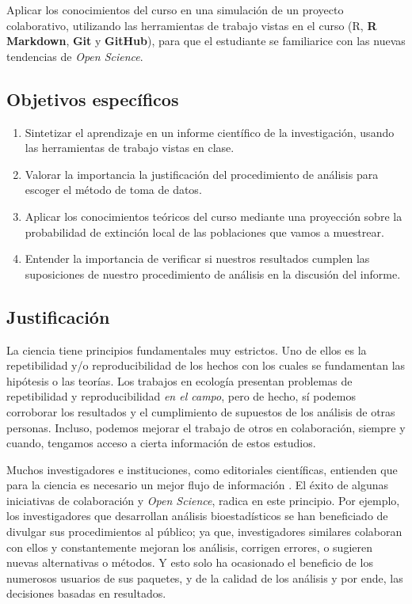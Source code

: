 \documentclass[12pt,letterpaper,]{book}
\begin{document}
Aplicar los conocimientos del curso en una simulación de un proyecto
colaborativo, utilizando las herramientas de trabajo vistas en el curso
(\textsf{R}, \textbf{R Markdown}, \textbf{Git} y \textbf{GitHub}), para
que el estudiante se familiarice con las nuevas tendencias de \emph{Open
Science}.

\subsection{Objetivos específicos}\label{objetivos-especificos}

\begin{enumerate}
\def\labelenumi{\arabic{enumi}.}
\item
  Sintetizar el aprendizaje en un informe científico de la
  investigación, usando las herramientas de trabajo vistas en clase.
\item
  Valorar la importancia la justificación del procedimiento de análisis
  para escoger el método de toma de datos.
\item
  Aplicar los conocimientos teóricos del curso mediante una proyección
  sobre la probabilidad de extinción local de las poblaciones que vamos
  a muestrear.
\item
  Entender la importancia de verificar si nuestros resultados cumplen
  las suposiciones de nuestro procedimiento de análisis en la discusión
  del informe.
\end{enumerate}

\subsection{Justificación}\label{justificacion}

La ciencia tiene principios fundamentales muy estrictos. Uno de ellos es
la repetibilidad y/o reproducibilidad de los hechos con los cuales se
fundamentan las hipótesis o las teorías. Los trabajos en ecología
presentan problemas de repetibilidad y reproducibilidad \emph{en el
campo}, pero de hecho, sí podemos corroborar los resultados y el
cumplimiento de supuestos de los análisis de otras personas. Incluso,
podemos mejorar el trabajo de otros en colaboración, siempre y cuando,
tengamos acceso a cierta información de estos estudios.

Muchos investigadores e instituciones, como editoriales científicas,
entienden que para la ciencia es necesario un mejor flujo de información
\citep{dataManagmentBES, reprodCodeBES}. El éxito de algunas iniciativas
de colaboración y \emph{Open Science}, radica en este principio. Por
ejemplo, los investigadores que desarrollan análisis bioestadísticos se
han beneficiado de divulgar sus procedimientos al público; ya que,
investigadores similares colaboran con ellos y constantemente mejoran
los análisis, corrigen errores, o sugieren nuevas alternativas o
métodos. Y esto solo ha ocasionado el beneficio de los numerosos
usuarios de sus paquetes, y de la calidad de los análisis y por ende,
las decisiones basadas en resultados.
\end{document}

